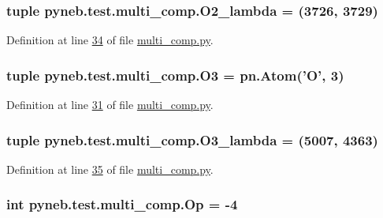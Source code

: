 \hypertarget{namespacepyneb_1_1test_1_1multi__comp_a1f68d28fa47ec3f8062f76c21d772d6e}{
\subsubsection[{O2\-\_\-lambda}]{\setlength{\rightskip}{0pt plus 5cm}tuple pyneb.\-test.\-multi\-\_\-comp.\-O2\-\_\-lambda = (3726, 3729)}}\label{namespacepyneb_1_1test_1_1multi__comp_a1f68d28fa47ec3f8062f76c21d772d6e}


Definition at line \hyperlink{multi__comp_8py_source_l00034}{34} of file \hyperlink{multi__comp_8py_source}{multi\-\_\-comp.\-py}.

\hypertarget{namespacepyneb_1_1test_1_1multi__comp_ac49b06657ba235ae0972deab3dd715ab}{
\subsubsection[{O3}]{\setlength{\rightskip}{0pt plus 5cm}tuple pyneb.\-test.\-multi\-\_\-comp.\-O3 = pn.\-Atom('O', 3)}}\label{namespacepyneb_1_1test_1_1multi__comp_ac49b06657ba235ae0972deab3dd715ab}


Definition at line \hyperlink{multi__comp_8py_source_l00031}{31} of file \hyperlink{multi__comp_8py_source}{multi\-\_\-comp.\-py}.

\hypertarget{namespacepyneb_1_1test_1_1multi__comp_ab480689bf8f9614cc0a70a5613489c99}{
\subsubsection[{O3\-\_\-lambda}]{\setlength{\rightskip}{0pt plus 5cm}tuple pyneb.\-test.\-multi\-\_\-comp.\-O3\-\_\-lambda = (5007, 4363)}}\label{namespacepyneb_1_1test_1_1multi__comp_ab480689bf8f9614cc0a70a5613489c99}


Definition at line \hyperlink{multi__comp_8py_source_l00035}{35} of file \hyperlink{multi__comp_8py_source}{multi\-\_\-comp.\-py}.

\hypertarget{namespacepyneb_1_1test_1_1multi__comp_acb5b32b16511efc23433aaade5b41544}{
\subsubsection[{Op}]{\setlength{\rightskip}{0pt plus 5cm}int pyneb.\-test.\-multi\-\_\-comp.\-Op = -\/4}}\label{namespacepyneb_1_1test_1_1multi__comp_acb5b32b16511efc23433aaade5b41544}


